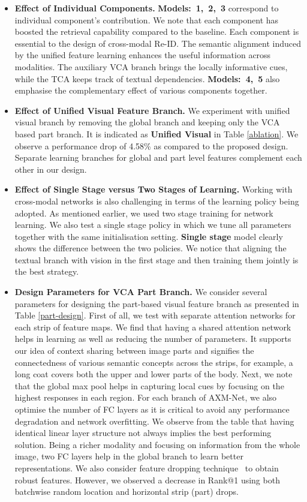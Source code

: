 \documentclass[10pt,twocolumn,letterpaper]{article}
\begin{document}
\begin{itemize}[noitemsep,nolistsep,itemindent=0pt,leftmargin=7pt]
    \item \textbf{Effect of Individual Components.} \textbf{Models:\ 1,\ 2,\ 3} correspond to individual component's contribution. We note that each component has boosted the retrieval capability compared to the baseline. Each component is essential to the design of cross-modal Re-ID. The semantic alignment induced by the unified feature learning enhances the useful information across modalities. The auxiliary VCA branch brings the locally informative cues, while the TCA keeps track of textual dependencies. \textbf{Models:\ 4,\ 5} also emphasise the complementary effect of various components together.
    \item \textbf{Effect of Unified Visual Feature Branch.} 
    We experiment with unified visual branch by removing the global branch and keeping only the VCA based part branch. It is indicated as \textbf{Unified Visual} in Table \ref{ablation}. We observe a performance drop of 4.58\% as compared to the proposed design. Separate learning branches for global and part level features complement each other in our design.
    \item \textbf{Effect of Single Stage versus Two Stages of Learning.}
    Working with cross-modal networks is also challenging in terms of the learning policy being adopted. As mentioned earlier, we used two stage training for network learning. We also test a single stage policy in which we tune all parameters together with the same initialisation setting. \textbf{Single stage} model clearly shows the difference between the two policies. We notice that aligning the textual branch with vision in the first stage and then training them jointly is the best strategy. 
    \item \textbf{Design Parameters for VCA Part Branch.}
    We consider several parameters for designing the part-based visual feature branch as presented in Table \ref{part-design}. First of all, we test with separate attention networks for each strip of feature maps. We find that having a shared attention network helps in learning as well as reducing the number of parameters. It supports our idea of context sharing between image parts and signifies the connectedness of various semantic concepts across the strips, for example, a long coat covers both the upper and lower parts of the body. Next, we note that the global max pool helps in capturing local cues by focusing on the highest responses in each region. For each branch of AXM-Net, we also optimise the number of FC layers as it is critical to avoid any performance degradation and network overfitting. We observe from the table that having identical linear layer structure not always implies the best performing solution. Being a richer modality and focusing on information from the whole image, two FC layers help in the global branch to learn better representations. We also consider feature dropping technique~\cite{dai2019batch} to obtain robust features. However, we observed a decrease in Rank@1 using both batchwise random location and horizontal strip (part) drops. 
    \end{itemize}
\end{document}
